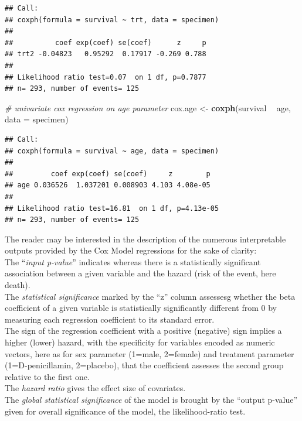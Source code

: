 \documentclass[]{article}
\newenvironment{Shaded}{\begin{snugshade}}{\end{snugshade}}
\newcommand{\KeywordTok}[1]{\textcolor[rgb]{0.13,0.29,0.53}{\textbf{#1}}}
\newcommand{\DataTypeTok}[1]{\textcolor[rgb]{0.13,0.29,0.53}{#1}}
\newcommand{\StringTok}[1]{\textcolor[rgb]{0.31,0.60,0.02}{#1}}
\newcommand{\CommentTok}[1]{\textcolor[rgb]{0.56,0.35,0.01}{\textit{#1}}}
\newcommand{\OperatorTok}[1]{\textcolor[rgb]{0.81,0.36,0.00}{\textbf{#1}}}
\newcommand{\NormalTok}[1]{#1}
\begin{document}
\begin{verbatim}
## Call:
## coxph(formula = survival ~ trt, data = specimen)
## 
##          coef exp(coef) se(coef)      z     p
## trt2 -0.04823   0.95292  0.17917 -0.269 0.788
## 
## Likelihood ratio test=0.07  on 1 df, p=0.7877
## n= 293, number of events= 125
\end{verbatim}

\begin{Shaded}
\begin{Highlighting}[]
\CommentTok{# univariate cox regression on age parameter}
\NormalTok{cox.age <-}\StringTok{ }\KeywordTok{coxph}\NormalTok{(survival }\OperatorTok{~}\StringTok{ }\NormalTok{age, }\DataTypeTok{data =}\NormalTok{ specimen)}
\end{Highlighting}
\end{Shaded}

\begin{verbatim}
## Call:
## coxph(formula = survival ~ age, data = specimen)
## 
##         coef exp(coef) se(coef)     z        p
## age 0.036526  1.037201 0.008903 4.103 4.08e-05
## 
## Likelihood ratio test=16.81  on 1 df, p=4.13e-05
## n= 293, number of events= 125
\end{verbatim}

The reader may be interested in the description of the numerous
interpretable outputs provided by the Cox Model regressions for the sake
of clarity:\\
The ``\emph{input p-value}'' indicates whereas there is a statistically
significant association between a given variable and the hazard (risk of
the event, here death).\\
The \emph{statistical significance} marked by the ``z'' column assessesg
whether the beta coefficient of a given variable is statistically
significantly different from 0 by measuring each regression coefficient
to its standard error.\\
The sign of the regression coefficient with a positive (negative) sign
implies a higher (lower) hazard, with the specificity for variables
encoded as numeric vectors, here as for sex parameter (1=male, 2=female)
and treatment parameter (1=D-penicillamin, 2=placebo), that the
coefficient assesses the second group relative to the first one.\\
The \emph{hazard ratio} gives the effect size of covariates.\\
The \emph{global statistical significance} of the model is brought by
the ``output p-value'' given for overall significance of the model, the
likelihood-ratio test.
\end{document}
